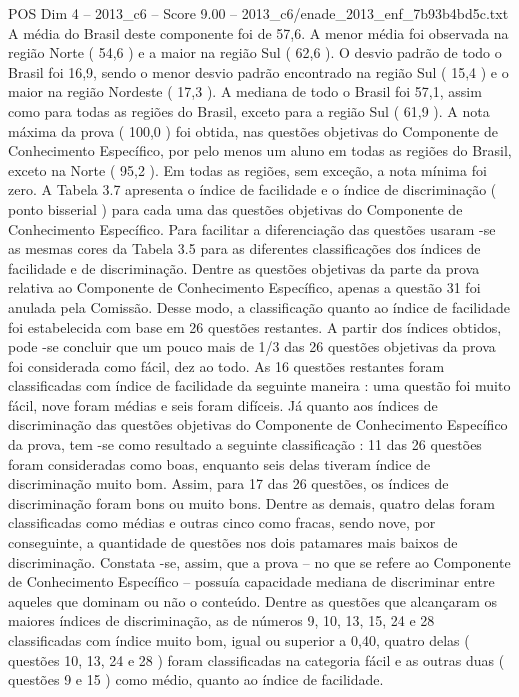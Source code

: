 \begin{textsample}{POS Dim 4 – 2013\_c6 – Score 9.00 – 2013\_c6/enade\_2013\_enf\_7b93b4bd5c.txt}
A média do Brasil deste componente foi de 57,6.
A menor média foi observada na região Norte ( 54,6 ) e a maior na região Sul ( 62,6 ).
O desvio padrão de todo o Brasil foi 16,9, sendo o menor desvio padrão encontrado na região Sul ( 15,4 ) e o maior na região Nordeste ( 17,3 ).
A mediana de todo o Brasil foi 57,1, assim como para todas as regiões do Brasil, exceto para a região Sul ( 61,9 ).
A nota máxima da prova ( 100,0 ) foi obtida, nas questões objetivas do Componente de Conhecimento Específico, por pelo menos um aluno em todas as regiões do Brasil, exceto na Norte ( 95,2 ).
Em todas as regiões, sem exceção, a nota mínima foi zero.
A Tabela 3.7 apresenta o índice de facilidade e o índice de discriminação ( ponto bisserial ) para cada uma das questões objetivas do Componente de Conhecimento Específico.
Para facilitar a diferenciação das questões usaram -se as mesmas cores da Tabela 3.5 para as diferentes classificações dos índices de facilidade e de discriminação.
Dentre as questões objetivas da parte da prova relativa ao Componente de Conhecimento Específico, apenas a questão 31 foi anulada pela Comissão.
Desse modo, a classificação quanto ao índice de facilidade foi estabelecida com base em 26 questões restantes.
A partir dos índices obtidos, pode -se concluir que um pouco mais de 1/3 das 26 questões objetivas da prova foi considerada como fácil, dez ao todo.
As 16 questões restantes foram classificadas com índice de facilidade da seguinte maneira : uma questão foi muito fácil, nove foram médias e seis foram difíceis.
Já quanto aos índices de discriminação das questões objetivas do Componente de Conhecimento Específico da prova, tem -se como resultado a seguinte classificação : 11 das 26 questões foram consideradas como boas, enquanto seis delas tiveram índice de discriminação muito bom.
Assim, para 17 das 26 questões, os índices de discriminação foram bons ou muito bons.
Dentre as demais, quatro delas foram classificadas como médias e outras cinco como fracas, sendo nove, por conseguinte, a quantidade de questões nos dois patamares mais baixos de discriminação.
Constata -se, assim, que a prova – no que se refere ao Componente de Conhecimento Específico – possuía capacidade mediana de discriminar entre aqueles que dominam ou não o conteúdo.
Dentre as questões que alcançaram os maiores índices de discriminação, as de números 9, 10, 13, 15, 24 e 28 classificadas com índice muito bom, igual ou superior a 0,40, quatro delas ( questões 10, 13, 24 e 28 ) foram classificadas na categoria fácil e as outras duas ( questões 9 e 15 ) como médio, quanto ao índice de facilidade.

\end{textsample}
